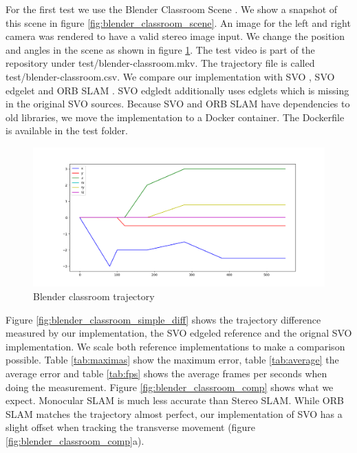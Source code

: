 \documentclass[11pt,a4paper,titlepage,oneside]{report}
\begin{document}
For the first test we use the Blender Classroom Scene \cite{blender}. We show a snapshot of this scene in figure \ref{fig:blender_classroom_scene}. An image for the left and right camera was rendered to have a valid stereo image input. We change the position and angles in the scene as shown in figure \ref{fig:blender_classroom_simple_traj}. The test video is part of the repository under test/blender-classroom.mkv. The trajectory file is called test/blender-classroom.csv. We compare our implementation with SVO \cite{svo}, SVO edgelet \cite{svo_edglet} and ORB SLAM \cite{orbslam}. SVO edgledt additionally uses edglets which is missing in the original SVO sources. Because SVO and ORB SLAM have dependencies to old libraries, we move the implementation to a Docker container. The Dockerfile is available in the test folder.

\begin{figure}[H]
  \centering
  \includegraphics[width=1.0\textwidth]{img/blender_classroom_simple_traj.png}
  \caption{Blender classroom trajectory}\label{fig:blender_classroom_simple_traj}
\end{figure}

Figure \ref{fig:blender_classroom_simple_diff} shows the trajectory difference measured by our implementation, the SVO edgeled reference and the orignal SVO implementation. We scale both reference implementations to make a comparison possible. Table \ref{tab:maximas} show the maximum error, table \ref{tab:average} the average error and table \ref{tab:fps} shows the average frames per seconds when doing the measurement. Figure \ref{fig:blender_classroom_comp} shows what we expect. Monocular SLAM is much less accurate than Stereo SLAM. While ORB SLAM matches the trajectory almost perfect, our implementation of SVO has a slight offset when tracking the transverse movement (figure \ref{fig:blender_classroom_comp}a).
\end{document}
